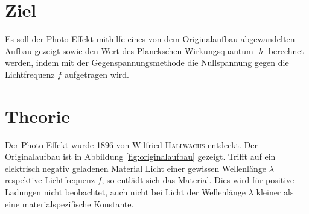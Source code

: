\section*{Ziel}
Es soll der Photo-Effekt mithilfe eines von dem Originalaufbau abgewandelten Aufbau gezeigt sowie den Wert des Planckschen Wirkungsquantum $\hslash$ berechnet werden, indem mit der Gegenspannungsmethode die Nullspannung gegen die Lichtfrequenz $f$ aufgetragen wird.
\section{Theorie}
\label{sec:Theorie}
Der Photo-Effekt wurde 1896 von Wilfried \textsc{Hallwachs} entdeckt.
Der Originalaufbau ist in Abbildung \ref{fig:originalaufbau} gezeigt.
Trifft auf ein elektrisch negativ geladenen Material Licht einer gewissen Wellenlänge $\lambda$ respektive Lichtfrequenz $f$, so entlädt sich das Material. 
Dies wird für positive Ladungen nicht beobachtet, auch nicht bei Licht der Wellenlänge $\lambda$ kleiner als eine materialspezifische Konstante.

